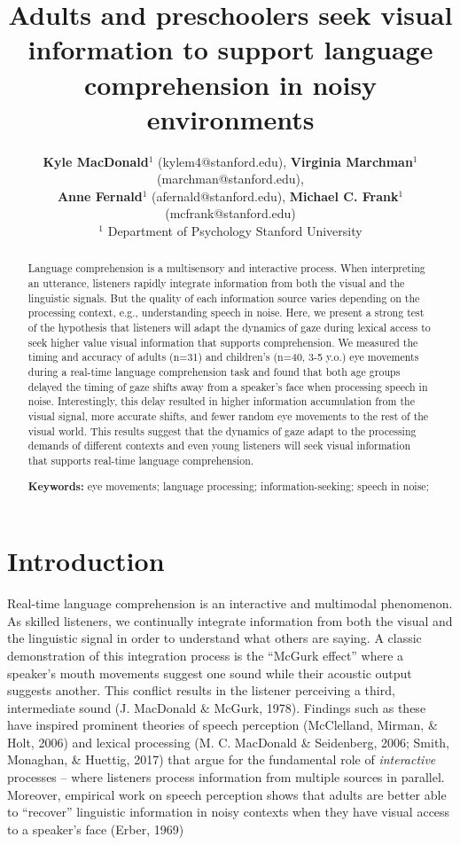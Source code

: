 \documentclass[10pt, letterpaper]{article}
\title{Adults and preschoolers seek visual information to support language
comprehension in noisy environments}
\author{ {\large \bf Kyle MacDonald}$^1$ (kylem4@stanford.edu), {\large \bf Virginia Marchman}$^1$ (marchman@stanford.edu),  \\ {\large \bf Anne Fernald}$^1$ (afernald@stanford.edu), {\large \bf Michael C. Frank}$^1$ (mcfrank@stanford.edu) 
  \\ $^1$ Department of Psychology Stanford University}
\begin{document}
\maketitle

\begin{abstract}
Language comprehension is a multisensory and interactive process. When
interpreting an utterance, listeners rapidly integrate information from
both the visual and the linguistic signals. But the quality of each
information source varies depending on the processing context, e.g.,
understanding speech in noise. Here, we present a strong test of the
hypothesis that listeners will adapt the dynamics of gaze during lexical
access to seek higher value visual information that supports
comprehension. We measured the timing and accuracy of adults (n=31) and
children's (n=40, 3-5 y.o.) eye movements during a real-time language
comprehension task and found that both age groups delayed the timing of
gaze shifts away from a speaker's face when processing speech in noise.
Interestingly, this delay resulted in higher information accumulation
from the visual signal, more accurate shifts, and fewer random eye
movements to the rest of the visual world. This results suggest that the
dynamics of gaze adapt to the processing demands of different contexts
and even young listeners will seek visual information that supports
real-time language comprehension.

\textbf{Keywords:}
eye movements; language processing; information-seeking; speech in
noise;
\end{abstract}

\section{Introduction}\label{introduction}

Real-time language comprehension is an interactive and multimodal
phenomenon. As skilled listeners, we continually integrate information
from both the visual and the linguistic signal in order to understand
what others are saying. A classic demonstration of this integration
process is the ``McGurk effect'' where a speaker's mouth movements
suggest one sound while their acoustic output suggests another. This
conflict results in the listener perceiving a third, intermediate sound
(J. MacDonald \& McGurk, 1978). Findings such as these have inspired
prominent theories of speech perception (McClelland, Mirman, \& Holt,
2006) and lexical processing (M. C. MacDonald \& Seidenberg, 2006;
Smith, Monaghan, \& Huettig, 2017) that argue for the fundamental role
of \emph{interactive} processes -- where listeners process information
from multiple sources in parallel. Moreover, empirical work on speech
perception shows that adults are better able to ``recover'' linguistic
information in noisy contexts when they have visual access to a
speaker's face (Erber, 1969)
\end{document}
